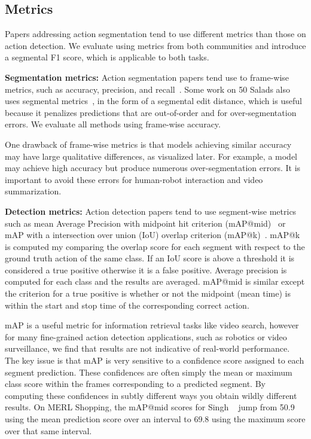 \documentclass[10pt,twocolumn,letterpaper]{article}
\newcommand{\fakesubsection}[1]{\smallskip\noindent\textbf{#1:}}
\begin{document}
\subsection{Metrics}
Papers addressing action segmentation tend to use different metrics than those on action detection. We evaluate using metrics from both communities and introduce a segmental F1 score, which is applicable to both tasks.


\fakesubsection{Segmentation metrics}
Action segmentation papers tend use to frame-wise metrics, such as accuracy, precision, and recall~\cite{stein_ubicomp_2013,kuehne_cvpr_2014}. Some work on 50 Salads also uses segmental metrics~\cite{lea_eccv_2016,lea_icra_2016}, in the form of a segmental edit distance, which is useful because it penalizes predictions that are out-of-order and for over-segmentation errors. We evaluate all methods using frame-wise accuracy.

One drawback of frame-wise metrics is that models achieving similar accuracy may have large qualitative differences, as visualized later.
For example, a model may achieve high accuracy but produce numerous over-segmentation errors. It is important to avoid these errors for human-robot interaction and video summarization. 



\fakesubsection{Detection metrics}
Action detection papers tend to use segment-wise metrics such as mean Average Precision with midpoint hit criterion (mAP@mid)~\cite{rohrbach_ijcv_2015,singh_cvpr_2016_merl} or mAP with a intersection over union (IoU) overlap criterion (mAP@k)~\cite{richard_cvpr_2016}. 
mAP@k is computed my comparing the overlap score for each segment with respect to the ground truth action of the same class. If an IoU score is above a threshold  it is considered a true positive otherwise it is a false positive. Average precision is computed for each class and the results are averaged. 
mAP@mid is similar except the criterion for a true positive is whether or not the midpoint (mean time) is within the start and stop time of the corresponding correct action.



mAP is a useful metric for information retrieval tasks like video search, however for many fine-grained action detection applications, such as robotics or video surveillance, we find that results are not indicative of real-world performance. 
The key issue is that mAP is very sensitive to a confidence score assigned to each segment prediction. 
These confidences are often simply the mean or maximum class score within the frames corresponding to a predicted segment.
By computing these confidences in subtly different ways you obtain wildly different results. 
On MERL Shopping, the mAP@mid scores for Singh \etal~\cite{singh_cvpr_2016_merl} jump from 50.9 using the mean prediction score over an interval to 69.8 using the maximum score over that same interval. 
\end{document}
